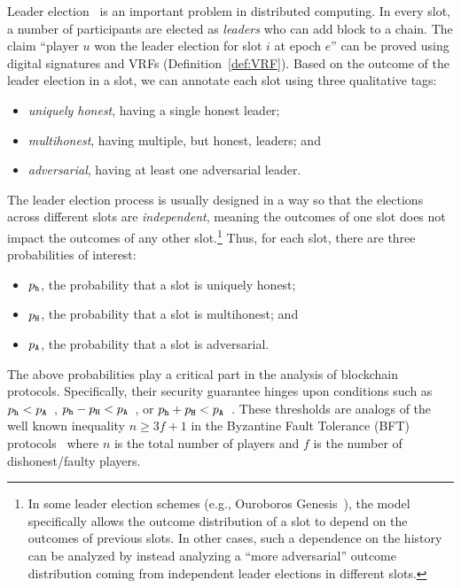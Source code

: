 \label{sec:leader-election-probs}
Leader election~\cite{RSZ} is an important problem in distributed computing.
In every slot, 
a number of participants are elected as \emph{leaders} who can add block to a chain. 
The claim ``player $u$ won the leader election for slot $i$ at epoch $e$'' 
can be proved using digital signatures and VRFs (Definition~\ref{def:VRF}).
Based on the outcome of the leader election in a slot, 
we can annotate each slot using three qualitative tags: 
\begin{itemize}
\item \emph{uniquely honest}, having a single honest leader;
\item \emph{multihonest}, having multiple, but honest,
  leaders; and
\item \emph{adversarial}, having at least one adversarial leader.
\end{itemize}
The leader election process is usually designed in a way so that 
the elections across different slots are \emph{independent}, 
meaning the outcomes of one slot does not impact the outcomes of any other slot.\footnote{
  In some leader election schemes (e.g., Ouroboros Genesis~\cite{Genesis}), 
  the model specifically allows 
  the outcome distribution of a slot to depend on the outcomes of previous slots. 
  In other cases, 
  such a dependence on the history can be analyzed 
  by instead analyzing a ``more adversarial'' outcome distribution 
  coming from independent leader elections in different slots. 
}
Thus, for each slot, there are three probabilities of interest:
\begin{itemize}
\item $p_{\mathtt{h}}$, the probability that a slot is uniquely honest;
\item $p_{\mathtt{H}}$, the probability that a slot is multihonest; and
\item $p_{\mathtt{A}}$, the probability that a slot is adversarial.
\end{itemize}

The above probabilities play a critical part 
in the analysis of blockchain protocols. 
Specifically, 
their security guarantee hinges upon conditions such as 
$p_{\mathtt{h}} < p_{\mathtt{A}}$~\cite{SnowWhite}, 
$p_{\mathtt{h}} - p_{\mathtt{H}} < p_{\mathtt{A}}$~\cite{Ouroboros,Praos,Genesis}, 
or $p_{\mathtt{h}} + p_{\mathtt{H}} < p_{\mathtt{A}}$~\cite{Nakamoto2008,GKL,PSS}.
These thresholds are analogs of the well known inequality 
$n \geq 3f + 1$ in the Byzantine Fault Tolerance (BFT) protocols~\cite{BFT} 
where $n$ is the total number of players and $f$ is the number of dishonest/faulty players.


